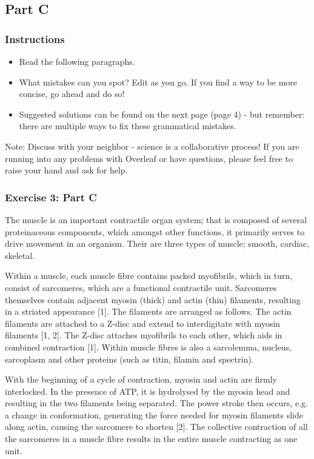 \documentclass{article}
\begin{document}
\newpage
\subsection*{Part C}

\subsubsection*{Instructions}

\begin{itemize}
\item Read the following paragraphs.
\item What mistakes can you spot? Edit as you go. If you find a way to be more concise, go ahead and do so!
\item Suggested solutions can be found on the next page (page 4) - but remember: there are multiple ways to fix these grammatical mistakes. 
\end{itemize}

Note: Discuss with your neighbor - science is a collaborative process! If you are running into any problems with Overleaf or have questions, please feel free to raise your hand and ask for help. 

\subsubsection*{Exercise 3: Part C}

The muscle is an important contractile organ system; that is composed of several proteinaceous components, which amongst other functions, it primarily serves to drive movement in an organism. Their are three types of muscle; smooth, cardiac, skeletal. 

Within a muscle, each muscle fibre contains packed myofibrils, which in turn, consist of sarcomeres, which are a functional contractile unit. Sarcomeres themselves contain adjacent myosin (thick) and actin (thin) filaments, resulting in a striated appearance [1]. The filaments are arranged as follows. The actin filaments are attached to a Z-disc and extend to interdigitate with myosin filaments [1, 2]. The Z-disc attaches myofibrils to each other, which aids in combined contraction [1]. Within muscle fibres is also a sarcolemma, nucleus, sarcoplasm and other proteins (such as titin, filamin and spectrin).

With the beginning of a cycle of contraction, myosin and actin are firmly interlocked. In the presence of ATP, it is hydrolysed by the myosin head and resulting in the two filaments being separated. The power stroke then occurs, e.g. a change in conformation, generating the force needed for myosin filaments slide along actin, causing the sarcomere to shorten [2]. The collective contraction of all the sarcomeres in a muscle fibre results in the entire muscle contracting as one unit. 
\end{document}
